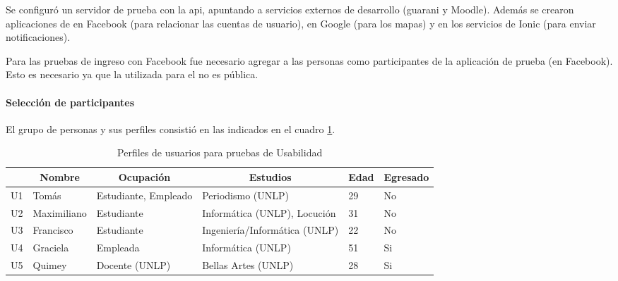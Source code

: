 Se configuró un servidor de prueba con la \gls{api}, apuntando a servicios externos de desarrollo (\gls{guarani} y Moodle). Además se crearon aplicaciones de  en Facebook (para relacionar las cuentas de usuario), en Google (para los mapas) y en los servicios de Ionic (para enviar notificaciones).

Para las pruebas de ingreso con Facebook fue necesario agregar a las personas como participantes de la aplicación de prueba (en Facebook). Esto es necesario ya que la utilizada para el  no es pública.

\paragraph{Selección de participantes}
\label{desarrollo_pruebas_usabilidad_preparativos_participantes}

El grupo de personas y sus perfiles consistió en las indicados en el cuadro \ref{perfiles_usabilidad}.

\begin{table}[htbp]
\centering
\caption{Perfiles de usuarios para pruebas de Usabilidad}
\label{perfiles_usabilidad}
\begin{tabular}{|l|l|p{2.5cm}|p{2.5cm}|l|l|}
\hline
   & \multicolumn{1}{c|}{\textbf{Nombre}} & \multicolumn{1}{c|}{\textbf{Ocupación}} & \multicolumn{1}{c|}{\textbf{Estudios}} & \textbf{Edad} & \textbf{Egresado} \\ \hline
U1 & Tomás                                & Estudiante, Empleado                    & Periodismo (UNLP)                      & 29                    & No                \\ \hline
U2 & Maximiliano\footnotemark{}                          & Estudiante                              & Informática (UNLP), Locución           & 31                    & No                \\ \hline
U3 & Francisco                                     & Estudiante                              & Ingeniería/Informática (UNLP)          & 22                    & No                \\ \hline
U4 & Graciela                             & Empleada                                & Informática (UNLP)                     & 51                    & Si                \\ \hline
U5 & Quimey                               & Docente (UNLP)                                 & Bellas Artes (UNLP)                    & 28                    & Si                \\ \hline
\end{tabular}
\end{table}

